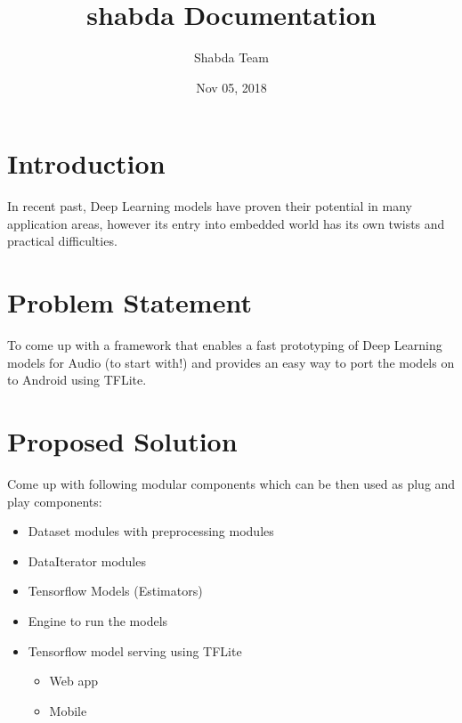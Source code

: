 \documentclass[letterpaper,10pt,english]{sphinxmanual}
\title{shabda Documentation}
\date{Nov 05, 2018}
\author{Shabda Team}
\begin{document}
\pagestyle{empty}
\maketitle
\pagestyle{plain}
\sphinxtableofcontents
\pagestyle{normal}
\label{\detokenize{index::doc}}



\chapter{Introduction}
\label{\detokenize{about:introduction}}\label{\detokenize{about:introduction}}\label{\detokenize{about::doc}}
In recent past, Deep Learning models have proven their potential in many application areas, however its entry into embedded world has its own twists and practical difficulties.


\chapter{Problem Statement}
\label{\detokenize{about:problem-statement}}\label{\detokenize{about:problem-statement}}
To come up with a framework that enables a fast prototyping of Deep Learning models for Audio (to start with!) and provides an easy way to port the models on to Android using TFLite.


\chapter{Proposed Solution}
\label{\detokenize{about:proposed-solution}}\label{\detokenize{about:proposed-solution}}
Come up with following modular components which can be then used as plug and play components:
\begin{itemize}
\item {} 
Dataset modules with preprocessing modules

\item {} 
DataIterator modules

\item {} 
Tensorflow Models (Estimators)

\item {} 
Engine to run the models

\item {} 
Tensorflow model serving using TFLite
\begin{itemize}
\item {} 
Web app

\item {} 
Mobile

\end{itemize}

\end{itemize}
\end{document}
